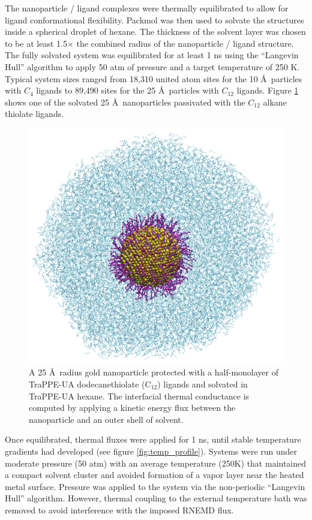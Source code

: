 \documentclass[aps,jcp,preprint,showpacs,superscriptaddress,groupedaddress]{revtex4-1}  %
\begin{document}
The nanoparticle / ligand complexes were thermally equilibrated to
allow for ligand conformational flexibility. Packmol was then used to
solvate the structures inside a spherical droplet of hexane. The
thickness of the solvent layer was chosen to be at least 1.5$\times$
the combined radius of the nanoparticle / ligand structure. The fully
solvated system was equilibrated for at least 1 ns using the
``Langevin Hull'' algorithm to apply 50 atm of pressure and a target
temperature of 250 K.\cite{Vardeman2011} Typical system sizes ranged
from 18,310 united atom sites for the 10 \AA\ particles with $C_4$
ligands to 89,490 sites for the 25 \AA\ particles with $C_{12}$
ligands.  Figure \ref{fig:NP25_C12h1} shows one of the solvated 25
\AA\ nanoparticles passivated with the $C_{12}$ alkane thiolate
ligands.

\begin{figure}
  \includegraphics[width=\linewidth]{figures/NP25_C12h1}
  \caption{A 25 \AA\ radius gold nanoparticle protected with a
    half-monolayer of TraPPE-UA dodecanethiolate (C$_{12}$) ligands
    and solvated in TraPPE-UA hexane. The interfacial thermal
    conductance is computed by applying a kinetic energy flux between
    the nanoparticle and an outer shell of solvent.}
  \label{fig:NP25_C12h1}
\end{figure}

Once equilibrated, thermal fluxes were applied for 1 ns, until stable
temperature gradients had developed (see figure
\ref{fig:temp_profile}). Systems were run under moderate pressure (50
atm) with an average temperature (250K) that maintained a compact
solvent cluster and avoided formation of a vapor layer near the heated
metal surface.  Pressure was applied to the system via the
non-periodic ``Langevin Hull'' algorithm.\cite{Vardeman2011} However,
thermal coupling to the external temperature bath was removed to avoid
interference with the imposed RNEMD flux.
\end{document}
